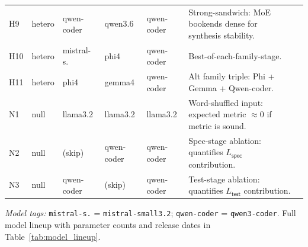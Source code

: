 \begin{table}[!htbp]
\begin{tabular}{@{}llllllp{4.5cm}@{}}
H9 & hetero & qwen-coder & qwen3.6 & qwen-coder & Strong-sandwich: MoE bookends dense for synthesis stability. \\
H10 & hetero & mistral-s. & phi4 & qwen-coder & Best-of-each-family-stage. \\
H11 & hetero & phi4 & gemma4 & qwen-coder & Alt family triple: Phi + Gemma + Qwen-coder. \\
N1 & null & llama3.2 & llama3.2 & llama3.2 & Word-shuffled input: expected metric $\approx 0$ if metric is sound. \\
N2 & null & (skip) & qwen-coder & qwen-coder & Spec-stage ablation: quantifies $L_{\textsf{spec}}$ contribution. \\
N3 & null & qwen-coder & (skip) & qwen-coder & Test-stage ablation: quantifies $L_{\textsf{test}}$ contribution. \\
\bottomrule
\end{tabular}

\vspace{2pt}
\raggedright\footnotesize
\emph{Model tags:} \texttt{mistral-s.} = \texttt{mistral-small3.2}; \texttt{qwen-coder} = \texttt{qwen3-coder}.
Full model lineup with parameter counts and release dates in Table~\ref{tab:model_lineup}.
\end{table}
